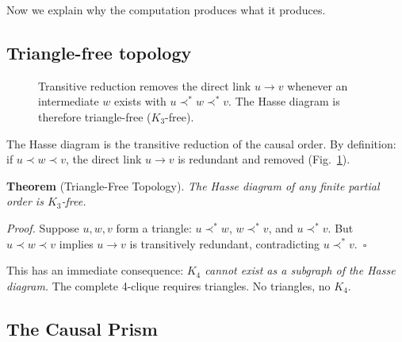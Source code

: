 \documentclass[aps,prd,twocolumn,superscriptaddress,nofootinbib,amsmath,amssymb,longbibliography]{revtex4-2}
\begin{document}
Now we explain why the computation produces what it produces.

\subsection{Triangle-free topology}

\begin{figure}[t]
\centering
{}
\caption{Transitive reduction removes the direct link $u \to v$ whenever
  an intermediate $w$ exists with $u \prec^* w \prec^* v$.
  The Hasse diagram is therefore triangle-free ($K_3$-free).}
\label{fig:triangle_free}
\end{figure}

The Hasse diagram is the transitive reduction of the causal order.
By definition: if $u \prec w \prec v$, the direct link $u \to v$
is redundant and removed (Fig.~\ref{fig:triangle_free}).

\textbf{Theorem} (Triangle-Free Topology).
\emph{The Hasse diagram of any finite partial order is $K_3$-free.}

\emph{Proof.}
Suppose $u, w, v$ form a triangle: $u \prec^* w$, $w \prec^* v$,
and $u \prec^* v$.  But $u \prec w \prec v$ implies $u \to v$ is
transitively redundant, contradicting $u \prec^* v$.~$\square$

This has an immediate consequence:
\emph{$K_4$ cannot exist as a subgraph of the Hasse diagram.}
The complete 4-clique requires triangles.  No triangles, no $K_4$.

\subsection{The Causal Prism}\label{sec:prism}
\end{document}
